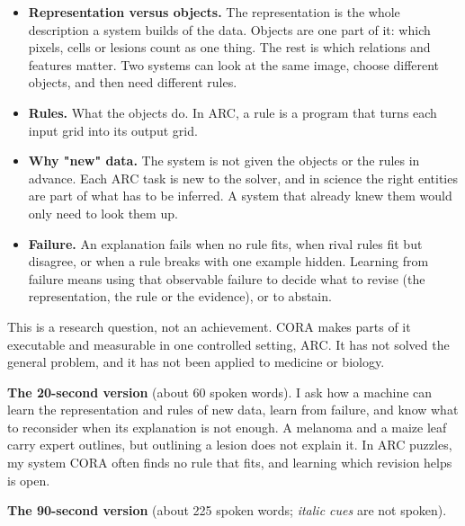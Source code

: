 \documentclass[11pt, a4paper]{article}
\begin{document}
\begin{itemize}
\item \textbf{Representation versus objects.} The representation is the whole description a system builds of the data. Objects
are one part of it: which pixels, cells or lesions count as one thing. The rest is which relations and features
matter. Two systems can look at the same image, choose different objects, and then need different rules.
\item \textbf{Rules.} What the objects do. In ARC, a rule is a program that turns each input grid into its output grid.
\item \textbf{Why "new" data.} The system is not given the objects or the rules in advance. Each ARC task is new to the solver,
and in science the right entities are part of what has to be inferred. A system that already knew them would only
need to look them up.
\item \textbf{Failure.} An explanation fails when no rule fits, when rival rules fit but disagree, or when a rule breaks with one
example hidden. Learning from failure means using that observable failure to decide what to revise (the
representation, the rule or the evidence), or to abstain.
\end{itemize}

This is a research question, not an achievement. CORA makes parts of it executable and measurable in one controlled
setting, ARC. It has not solved the general problem, and it has not been applied to medicine or biology.

\textbf{The 20-second version} (about 60 spoken words). I ask how a machine can learn the representation and rules of new
data, learn from failure, and know what to reconsider when its explanation is not enough. A melanoma and a maize leaf
carry expert outlines, but outlining a lesion does not explain it. In ARC puzzles, my system CORA often finds no rule
that fits, and learning which revision helps is open.

\textbf{The 90-second version} (about 225 spoken words; \emph{italic cues} are not spoken).
\end{document}
